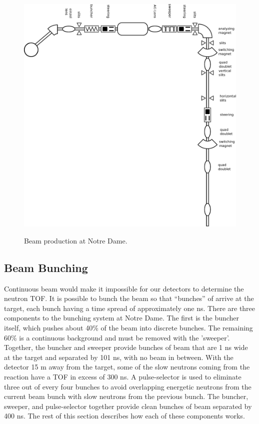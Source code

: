 \begin{figure}[htp]
\centering
\includegraphics[width=1.0\textwidth]{figures/NSL_beamline.eps}
\label{fig:beamline}
\caption{Beam production at Notre Dame.}
\end{figure}

\subsection{Beam Bunching}

Continuous beam would make it impossible for our detectors to determine the neutron TOF.  It is possible to bunch the beam so that ``bunches'' of  arrive at the target, each bunch having a time spread of approximately one ns. There are three components to the bunching system at Notre Dame.  The first is the buncher itself, which pushes about 40\% of the beam into discrete bunches.  The remaining 60\% is a continuous background and must be removed with the 'sweeper'.  Together, the buncher and sweeper provide bunches of beam that are 1 ns wide at the target and separated by 101 ns, with no beam in between.  With the detector 15 m away from the target, some of the slow neutrons coming from the reaction have a TOF in excess of 300 ns.  A pulse-selector is used to eliminate three out of every four bunches to avoid overlapping energetic neutrons from the current beam bunch with slow neutrons from the previous bunch.  The buncher, sweeper, and pulse-selector together provide clean bunches of beam separated by 400 ns.  The rest of this section describes how each of these components works.

